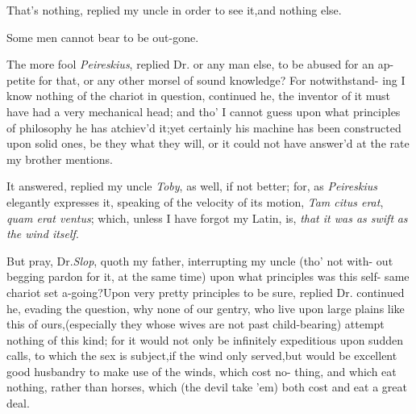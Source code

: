 \documentclass{article}
\begin{document}
\tsk That’s nothing, replied my uncle 
in order to see it,\tsk and nothing else.

Some men cannot bear to be out-gone.

The more fool \textit{Peireskius}, replied Dr.
or any man else, to be abused for an ap-
petite for that, or any other morsel of
sound knowledge? For notwithstand-\break
ing I know nothing of the chariot in\break
question, continued he, the inventor of it must have had a very mechanical head;\break
and tho’ I cannot guess upon what prin\-ciples of philosophy he has atchiev’d\break
it;\tsh yet certainly his machine has\break
been constructed upon solid ones, be\break
they what they will, or it could not\break
have answer’d at the rate my brother\break
mentions.

It answered, replied my uncle \textit{Toby},\break
as well, if not better; for, as \textit{Peireskius}\break
elegantly expresses it, speaking of the\break
velocity of its motion, \textit{Tam citus erat},\break
\textit{quam erat ventus}; which, unless I have\break
forgot my Latin, is, \textit{that it was as swift}\break 
\textit{as the wind itself}.

But pray, Dr.\@ \textit{Slop}, quoth my father,\break
interrupting my uncle (tho’ not with-\break
out begging pardon for it, at the same
time) upon what principles was this self-\break
same chariot set a-going?\tsk Upon very pretty principles to be sure, replied
Dr.\break
{}\break
continued he, evading
the question, why none of our gentry, who live upon large plains
like this of ours,\tsk (especially they whose wives are not past
child-bearing) attempt nothing of this kind; for it\break
would not only be infinitely expeditious\break
upon sudden calls, to which the sex is\break
subject,\tsk if the wind only served,\tsk but\break 
would be excellent good husbandry to\break
make use of the winds, which cost no-\break
thing, and which eat nothing, rather\break
than horses, which (the devil take ’em)\break 
both cost and eat a great deal.
\end{document}
